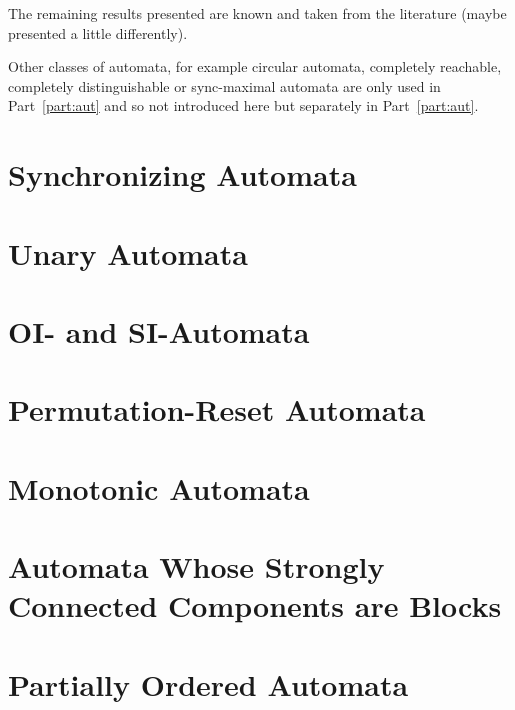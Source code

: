 The remaining results presented are known and taken from the literature (maybe presented a little differently).

Other classes of automata, for example circular automata, completely
reachable, completely distinguishable or
sync-maximal automata are only used in Part~\ref{part:aut} and so not introduced
here but separately in Part~\ref{part:aut}.

\section{Synchronizing Automata}
\label{prelim:sec:sync_aut} 



\section{Unary Automata}
\label{prelim:subclasses:ternarybinaryunary}



\section{OI- and SI-Automata}
\label{prelim:subclasses:SI}
	


\section{Permutation-Reset Automata}
\label{prelim:subclasses:permutation-reset} 



\section{Monotonic Automata} 
\label{prelim:subclasses:monotonic}



\section{Automata Whose Strongly Connected Components are Blocks}
\label{prelim:subclasses:block} 



\section{Partially Ordered Automata}
\label{prelim:sec:pto} 

